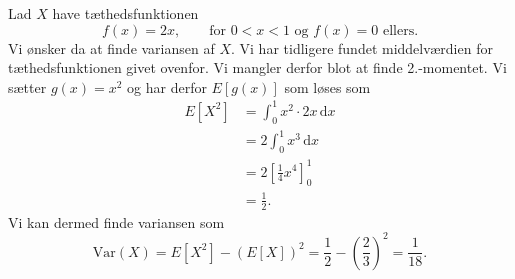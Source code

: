 \begin{eks}
  Lad $X$ have tæthedsfunktionen
  \[ 
  f(x) = 2x, \qquad \text{for } 0 < x < 1 \text{ og } f(x) = 0 \text{ ellers}
  .\]
  Vi ønsker da at finde variansen af $X$. Vi har tidligere fundet middelværdien for tæthedsfunktionen givet ovenfor. Vi mangler derfor blot at finde 2.-momentet. Vi sætter $g(x) = x^2$ og har derfor $E[g(x)]$ som løses som
  \begin{align*}
    E \left[ X^2 \right] &= \int_{0}^{1} x^2 \cdot 2x \, \mathrm{d}x  \\
    &= 2 \int_{0}^{1} x^3 \, \mathrm{d}x \\ 
    &= 2 \left[ \frac{1}{4}x^{4} \right]_0^{1} \\
    &= \frac{1}{2}
  .\end{align*}
  Vi kan dermed finde variansen som
  \[ 
    \mathrm{Var}(X) = E \left[ X^2 \right] - (E[X])^2 = \frac{1}{2} - \left( \frac{2}{3} \right)^2 = \frac{1}{18}
  .\]
\end{eks}
